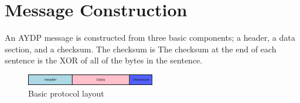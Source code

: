 \chapter{Message Construction}
An AYDP message is constructed from three basic components; a header, a data section, and a checksum. The checksum is The checksum at the end of each sentence is the XOR of all of the bytes in the sentence.

\begin{figure}[H]
  \centering
  \includegraphics[width=0.5\textwidth]{Figures/protocolBasicLayout.png}
  \caption{Basic protocol layout}
\end{figure}

 